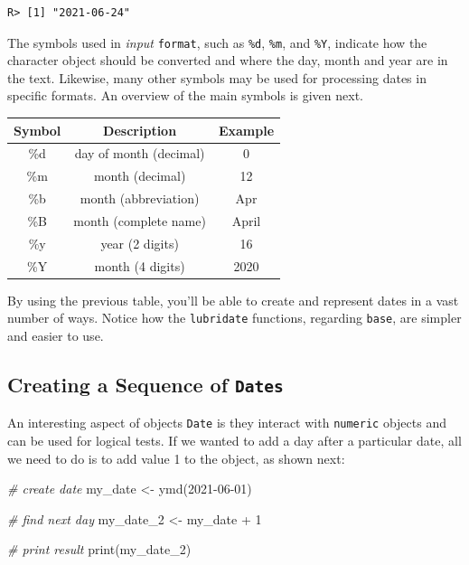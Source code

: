 \documentclass[
  12pt,
]{book}
\newenvironment{Shaded}{\begin{snugshade}}{\end{snugshade}}
\newcommand{\CommentTok}[1]{\textcolor[rgb]{0.37,0.37,0.37}{\textit{#1}}}
\newcommand{\DecValTok}[1]{\textcolor[rgb]{0.06,0.06,0.06}{#1}}
\newcommand{\FunctionTok}[1]{\textcolor[rgb]{0,0,0}{#1}}
\newcommand{\NormalTok}[1]{#1}
\newcommand{\OtherTok}[1]{\textcolor[rgb]{0.37,0.37,0.37}{#1}}
\newcommand{\SpecialCharTok}[1]{\textcolor[rgb]{0,0,0}{#1}}
\newcommand{\StringTok}[1]{\textcolor[rgb]{0.5,0.5,0.5}{#1}}
\begin{document}
\begin{verbatim}
R> [1] "2021-06-24"
\end{verbatim}

The symbols used in \emph{input} \texttt{format}, such as \texttt{\%d}, \texttt{\%m}, and \texttt{\%Y}, indicate how the character object should be converted and where the day, month and year are in the text. Likewise, many other symbols may be used for processing dates in specific formats. An overview of the main symbols is given next.

\begin{longtable}[]{@{}ccc@{}}
\toprule()
Symbol & Description & Example \\
\midrule()
\endhead
\%d & day of month (decimal) & 0 \\
\%m & month (decimal) & 12 \\
\%b & month (abbreviation) & Apr \\
\%B & month (complete name) & April \\
\%y & year (2 digits) & 16 \\
\%Y & month (4 digits) & 2020 \\
\bottomrule()
\end{longtable}

By using the previous table, you'll be able to create and represent dates in a vast number of ways. Notice how the \texttt{lubridate} functions, regarding \texttt{base}, are simpler and easier to use.

\hypertarget{creating-a-sequence-of-dates}{%
\subsection{\texorpdfstring{Creating a Sequence of \texttt{Dates}}{Creating a Sequence of Dates}}\label{creating-a-sequence-of-dates}}

An interesting aspect of objects \texttt{Date} is they interact with \texttt{numeric} objects and can be used for logical tests. If we wanted to add a day after a particular date, all we need to do is to add value 1 to the object, as shown next:

\begin{Shaded}
\begin{Highlighting}[]
\CommentTok{\# create date}
\NormalTok{my\_date }\OtherTok{\textless{}{-}} \FunctionTok{ymd}\NormalTok{(}\StringTok{\textquotesingle{}2021{-}06{-}01\textquotesingle{}}\NormalTok{)}

\CommentTok{\# find next day}
\NormalTok{my\_date\_2 }\OtherTok{\textless{}{-}}\NormalTok{ my\_date }\SpecialCharTok{+} \DecValTok{1}

\CommentTok{\# print result}
\FunctionTok{print}\NormalTok{(my\_date\_2)}
\end{Highlighting}
\end{Shaded}
\end{document}
